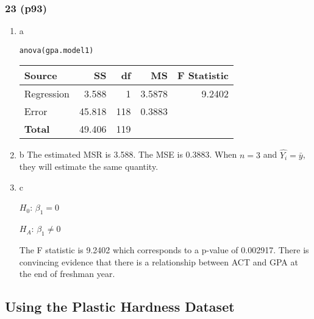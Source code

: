 \documentclass[11pt]{article}
\begin{document}
\subsubsection{23 (p93)}
\label{sec:org9171a64}
\begin{enumerate}
\item a
\label{sec:orgc766a8c}

\begin{verbatim}
anova(gpa.model1)
\end{verbatim}
\begin{center}
\begin{tabular}{lrrrr}
Source & SS & df & MS & F Statistic\\
\hline
Regression & 3.588 & 1 & 3.5878 & 9.2402\\
Error & 45.818 & 118 & 0.3883 & \\
\textbf{Total} & 49.406 & 119 &  & \\
\end{tabular}
\end{center}

\item b
\label{sec:orgc88a290}
The estimated MSR is 3.588. The MSE is 0.3883. When \(n = 3\) and \(\hat{Y_i} =
\bar{y}\), they will estimate the same quantity.
\item c
\label{sec:orgd49bdef}

\(H_0\): \(\beta_1 = 0\)

\(H_A\): \(\beta_1 \neq 0\)

The F statistic is 9.2402 which corresponds to a p-value of 0.002917. There is
convincing evidence that there is a relationship between ACT and GPA at the end
of freshman year.
\end{enumerate}

\subsection{Using the Plastic Hardness Dataset}
\label{sec:orgeabd5e6}
\end{document}
